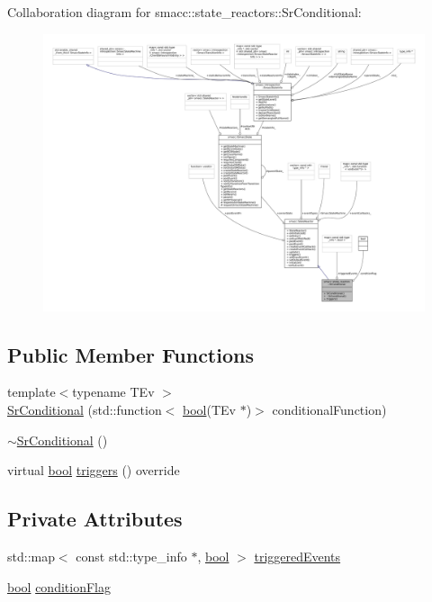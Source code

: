 Collaboration diagram for smacc\+:\+:state\+\_\+reactors\+:\+:Sr\+Conditional\+:
\nopagebreak
\begin{figure}[H]
\begin{center}
\leavevmode
\includegraphics[width=350pt]{classsmacc_1_1state__reactors_1_1SrConditional__coll__graph}
\end{center}
\end{figure}
\subsection*{Public Member Functions}
\begin{DoxyCompactItemize}
\item 
{\footnotesize template$<$typename T\+Ev $>$ }\\\hyperlink{classsmacc_1_1state__reactors_1_1SrConditional_ab89bc8f9d29e8a614eb6618af8596402}{Sr\+Conditional} (std\+::function$<$ \hyperlink{classbool}{bool}(T\+Ev $\ast$)$>$ conditional\+Function)
\item 
\hyperlink{classsmacc_1_1state__reactors_1_1SrConditional_a36266efcfd8ba0582ed500bd51e7d2b6}{$\sim$\+Sr\+Conditional} ()
\item 
virtual \hyperlink{classbool}{bool} \hyperlink{classsmacc_1_1state__reactors_1_1SrConditional_acbd91c59644957faac4e9d7716513cb4}{triggers} () override
\end{DoxyCompactItemize}
\subsection*{Private Attributes}
\begin{DoxyCompactItemize}
\item 
std\+::map$<$ const std\+::type\+\_\+info $\ast$, \hyperlink{classbool}{bool} $>$ \hyperlink{classsmacc_1_1state__reactors_1_1SrConditional_a6d841c624d6f6875db2ab6c6314bc3e1}{triggered\+Events}
\item 
\hyperlink{classbool}{bool} \hyperlink{classsmacc_1_1state__reactors_1_1SrConditional_a3642c78c02f02ed8eb0e5a41240f445c}{condition\+Flag}
\end{DoxyCompactItemize}
